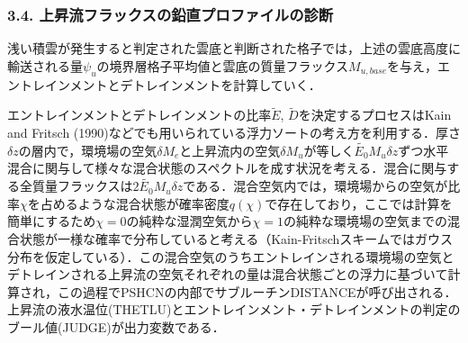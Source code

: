 \hypertarget{ux4e0aux6607ux6d41ux30d5ux30e9ux30c3ux30afux30b9ux306eux925bux76f4ux30d7ux30edux30d5ux30a1ux30a4ux30ebux306eux8a3aux65ad}{%
\subsubsection{3.4.
上昇流フラックスの鉛直プロファイルの診断}\label{ux4e0aux6607ux6d41ux30d5ux30e9ux30c3ux30afux30b9ux306eux925bux76f4ux30d7ux30edux30d5ux30a1ux30a4ux30ebux306eux8a3aux65ad}}

浅い積雲が発生すると判定された雲底と判断された格子では，上述の雲底高度に輸送される量\(\psi_u\)の境界層格子平均値と雲底の質量フラックス\(M_{u,base}\)を与え，エントレインメントとデトレインメントを計算していく．

エントレインメントとデトレインメントの比率\(\tilde{E}\),
\(\tilde{D}\)を決定するプロセスはKain and Fritsch
(1990)などでも用いられている浮力ソートの考え方を利用する．厚さ\(\delta z\)の層内で，環境場の空気\(\delta M_e\)と上昇流内の空気\(\delta M_u\)が等しく\(\tilde{E_0} M_u \delta z\)ずつ水平混合に関与して様々な混合状態のスペクトルを成す状況を考える．混合に関与する全質量フラックスは\(2\tilde{E_0} M_u\delta z\)である．混合空気内では，環境場からの空気が比率\(\chi\)を占めるような混合状態が確率密度\(q(\chi)\)で存在しており，ここでは計算を簡単にするため\(\chi=0\)の純粋な湿潤空気から\(\chi=1\)の純粋な環境場の空気までの混合状態が一様な確率で分布していると考える（Kain-Fritschスキームではガウス分布を仮定している）．この混合空気のうちエントレインされる環境場の空気とデトレインされる上昇流の空気それぞれの量は混合状態ごとの浮力に基づいて計算され，この過程でPSHCNの内部でサブルーチンDISTANCEが呼び出される．上昇流の液水温位(THETLU)とエントレインメント・デトレインメントの判定のブール値(JUDGE)が出力変数である．


